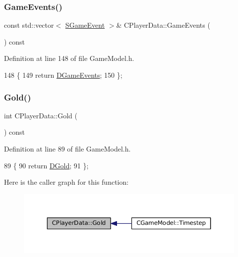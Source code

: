 \subsubsection{\texorpdfstring{Game\+Events()}{GameEvents()}}
{\footnotesize\ttfamily const std\+::vector$<$ \hyperlink{structSGameEvent}{S\+Game\+Event} $>$\& C\+Player\+Data\+::\+Game\+Events (\begin{DoxyParamCaption}{ }\end{DoxyParamCaption}) const\hspace{0.3cm}{\ttfamily [inline]}}



Definition at line 148 of file Game\+Model.\+h.


\begin{DoxyCode}
148                                                          \{
149             \textcolor{keywordflow}{return} \hyperlink{classCPlayerData_a9a7af43e88055d6d1a384a8817a655a0}{DGameEvents};
150         \};
\end{DoxyCode}
\hypertarget{classCPlayerData_afa5c728fc86335a9ca00b5121c0ec765}{}\label{classCPlayerData_afa5c728fc86335a9ca00b5121c0ec765} 
\subsubsection{\texorpdfstring{Gold()}{Gold()}}
{\footnotesize\ttfamily int C\+Player\+Data\+::\+Gold (\begin{DoxyParamCaption}{ }\end{DoxyParamCaption}) const\hspace{0.3cm}{\ttfamily [inline]}}



Definition at line 89 of file Game\+Model.\+h.


\begin{DoxyCode}
89                         \{
90             \textcolor{keywordflow}{return} \hyperlink{classCPlayerData_afa66ff31262c9b287ae8c13259aae6f3}{DGold};   
91         \};
\end{DoxyCode}
Here is the caller graph for this function\+:\nopagebreak
\begin{figure}[H]
\begin{center}
\leavevmode
\includegraphics[width=350pt]{classCPlayerData_afa5c728fc86335a9ca00b5121c0ec765_icgraph}
\end{center}
\end{figure}
\hypertarget{classCPlayerData_abba8a81a8d4d8309e8cd68016ee1900b}{}\label{classCPlayerData_abba8a81a8d4d8309e8cd68016ee1900b} 
